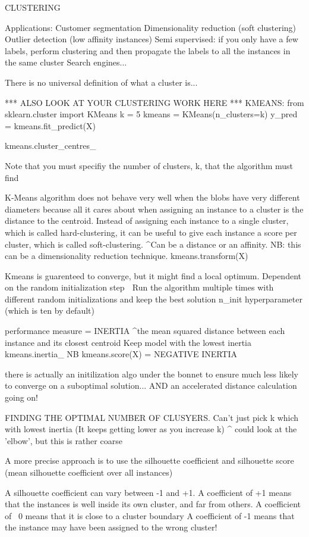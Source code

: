 CLUSTERING

Applications:
Customer segmentation
Dimensionality reduction (soft clustering)
Outlier detection (low affinity instances)
Semi supervised: if you only have a few labels, perform clustering and then propagate the labels to all the instances in the same cluster
Search engines...

There is no universal definition of what a cluster is...

*** ALSO LOOK AT YOUR CLUSTERING WORK HERE ***
KMEANS:
from sklearn.cluster import KMeans
k = 5
kmeans = KMeans(n_clusters=k)
y_pred = kmeans.fit_predict(X)

kmeans.cluster_centres_

Note that you must specifiy the number of clusters, k, that the algorithm must find

K-Means algorithm does not behave very well when the blobs have very different diameters because all it cares about
when assigning an instance to a cluster is the distance to the centroid.
Instead of assigning each instance to a single cluster, which is called hard-clustering,
it can be useful to give each instance a score per cluster, which is called soft-clustering.
^Can be a distance or an affinity. NB: this can be a dimensionality reduction technique.
kmeans.transform(X)

Kmeans is guarenteed to converge, but it might find a local optimum.
Dependent on the random initialization step
^^^ Run the algorithm multiple times with different random initializations and keep the best solution
n_init hyperparameter (which is ten by default)

performance measure = INERTIA
^the mean squared distance between each instance and its closest centroid
Keep model with the lowest inertia
kmeans.inertia_
NB kmeans.score(X) = NEGATIVE INERTIA

there is actually an initilization algo under the bonnet
to ensure much less likely to converge on a suboptimal solution...
AND an accelerated distance calculation going on!

FINDING THE OPTIMAL NUMBER OF CLUSYERS.
Can't just pick k which with lowest inertia
(It keeps getting lower as you increase k)
^ could look at the 'elbow', but this is rather coarse

A more precise approach is to use the silhouette coefficient
and silhouette score (mean silhouette coefficient over all instances)

A silhouette coefficient can vary between -1 and +1.
A coefficient of +1 means that the instances is well inside its own cluster, and far from others.
A coefficient of ~0 means that it is close to a cluster boundary
A coefficient of -1 means that the instance may have been assigned to the wrong cluster!

